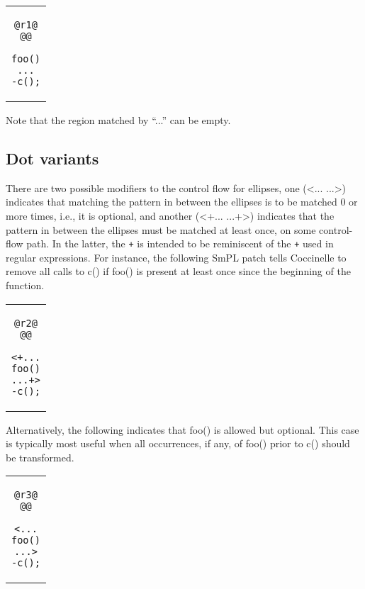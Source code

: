 \begin{center}
\begin{tabular}{c}
\begin{lstlisting}[language=Cocci]
@r1@
@@

foo()
...
-c();
\end{lstlisting}\\
\end{tabular}
\end{center}

Note that the region matched by ``...'' can be empty.

\subsection{Dot variants}
There are two possible modifiers to the control flow for ellipses, one
(<... ...>) indicates that matching the pattern in between the ellipses is
to be matched 0 or more times, i.e., it is
optional, and another (<+... ...+>) indicates that the pattern in between
the ellipses must be matched at least once, on some control-flow path.  In
the latter, the \texttt{+} is intended to be reminiscent of the \texttt{+}
used in regular expressions.  For instance, the following SmPL patch tells
Coccinelle to remove all calls to c() if foo() is present at least
once since the beginning of the function.

\begin{center}
\begin{tabular}{c}
\begin{lstlisting}[language=Cocci]
@r2@
@@

<+...
foo()
...+>
-c();

\end{lstlisting}\\
\end{tabular}
\end{center}

Alternatively, the following indicates that foo() is allowed but optional.
This case is typically most useful when all occurrences, if any, of foo()
prior to c() should be transformed.

\begin{center}
\begin{tabular}{c}
\begin{lstlisting}[language=Cocci]
@r3@
@@

<...
foo()
...>
-c();

\end{lstlisting}\\
\end{tabular}
\end{center}

